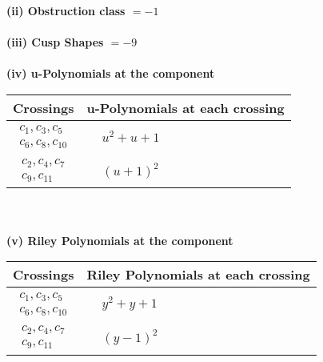 \documentclass[1p]{elsarticle_modified}
\theoremstyle{definition}
\begin{document}
\flushleft \textbf{(ii) Obstruction class $= -1$}\\~\\
\flushleft \textbf{(iii) Cusp Shapes $= -9$}\\~\\
\newpage\renewcommand{\arraystretch}{1}
\flushleft \textbf{(iv) u-Polynomials at the component}\newline \\
\begin{tabular}{m{50pt}|m{274pt}}
Crossings & \hspace{64pt}u-Polynomials at each crossing \\
\hline $$\begin{aligned}c_{1},c_{3},c_{5}\\c_{6},c_{8},c_{10}\end{aligned}$$&$\begin{aligned}
&u^2+u+1
\end{aligned}$\\
\hline $$\begin{aligned}c_{2},c_{4},c_{7}\\c_{9},c_{11}\end{aligned}$$&$\begin{aligned}
&(u+1)^2
\end{aligned}$\\
\hline
\end{tabular}\\~\\
\newpage\renewcommand{\arraystretch}{1}
\flushleft \textbf{(v) Riley Polynomials at the component}\newline \\
\begin{tabular}{m{50pt}|m{274pt}}
Crossings & \hspace{64pt}Riley Polynomials at each crossing \\
\hline $$\begin{aligned}c_{1},c_{3},c_{5}\\c_{6},c_{8},c_{10}\end{aligned}$$&$\begin{aligned}
&y^2+y+1
\end{aligned}$\\
\hline $$\begin{aligned}c_{2},c_{4},c_{7}\\c_{9},c_{11}\end{aligned}$$&$\begin{aligned}
&(y-1)^2
\end{aligned}$\\
\hline
\end{tabular}\\~\\
\end{document}
